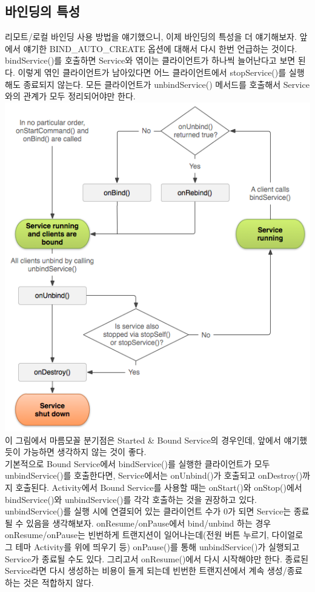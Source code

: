\subsection{바인딩의 특성}
\label{subsec:binding_special}
리모트/로컬 바인딩 사용 방법을 얘기했으니, 이제 바인딩의 특성을 더 얘기해보자. 앞에서 얘기한 BIND\_AUTO\_CREATE 옵션에 대해서 다시 한번 언급하는 것이다. 
bindService()를 호출하면 Service와 엮이는 클라이언트가 하나씩 늘어난다고 보면 된다. 
이렇게 엮인 클라이언트가 남아있다면 어느 클라이언트에서 stopService()를 실행해도 종료되지 않는다. 모든 클라이언트가 unbindService() 메서드를 호출해서 Service와의 관계가 모두 정리되어야만 한다.\\
\includegraphics[scale=0.5]{service-binding-tree-lifecycle}\\
이 그림에서 마름모꼴 분기점은 Started \& Bound Service의 경우인데, 앞에서 얘기했듯이 가능하면 생각하지 않는 것이 좋다.\\

기본적으로 Bound Service에서 bindService()를 실행한 클라이언트가 모두 unbindService()를 호출한다면, Service에서는 onUnbind()가 호출되고 onDestroy()까지 호출된다.
Activity에서 Bound Service를 사용할 때는 onStart()와 onStop()에서 bindService()와 unbindService()를 각각 호출하는 것을 권장하고 있다. unbindService()를 실행 시에 연결되어 있는 클라이언트 수가 0가 되면 Service는 종료될 수 있음을 생각해보자. onResume/onPause에서 bind/unbind 하는 경우 onResume/onPause는 빈번하게 트랜지션이 일어나는데(전원 버튼 누르기, 다이얼로그 테마 Activity를 위에 띄우기 등) onPause()를 통해 unbindService()가 실행되고 Service가 종료될 수도 있다. 
그리고서 onResume()에서 다시 시작해야만 한다. 종료된 Service라면 다시 생성하는 비용이 들게 되는데 빈번한 트랜지션에서 계속 생성/종료하는 것은 적합하지 않다.\\

